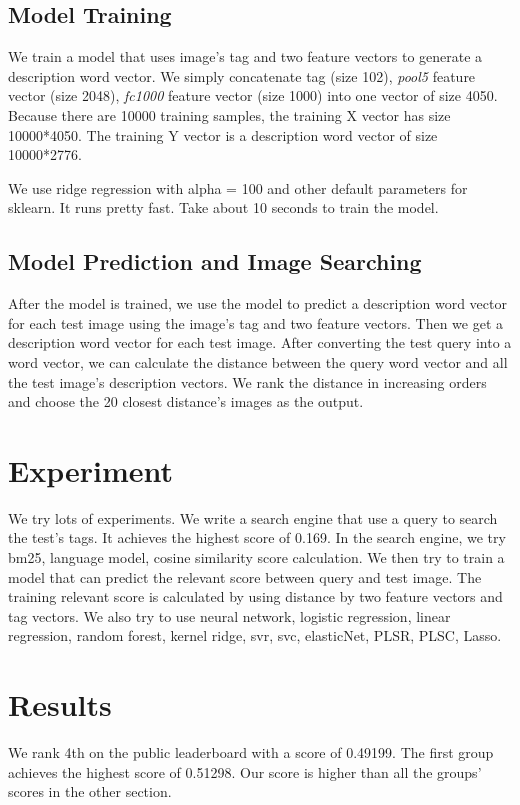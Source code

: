 \documentclass{article} %
\begin{document}
\subsection{Model Training}
We train a model that uses image's tag and two feature vectors to generate a description word vector. We simply concatenate tag (size 102), \textit{pool5} feature vector (size 2048), \textit{fc1000} feature vector (size 1000) into one vector of size 4050. Because there are 10000 training samples, the training X vector has size 10000*4050. The training Y vector is a description word vector of size 10000*2776.

We use ridge regression with alpha = 100 and other default parameters for sklearn. It runs pretty fast. Take about 10 seconds to train the model.

\subsection{Model Prediction and Image Searching}
After the model is trained, we use the model to predict a description word vector for each test image using the image's tag and two feature vectors. Then we get a description word vector for each test image. After converting the test query into a word vector, we can calculate the distance between the query word vector and all the test image's description vectors. We rank the distance in increasing orders and choose the 20 closest distance's images as the output.

\section{Experiment}

We try lots of experiments. We write a search engine that use a query to search the test's tags. It achieves the highest score of 0.169. In the search engine, we try bm25, language model, cosine similarity score calculation. We then try to train a model that can predict the relevant score between query and test image. The training relevant score is calculated by using distance by two feature vectors and tag vectors. We also try to use neural network, logistic regression, linear regression, random forest, kernel ridge, svr, svc, elasticNet, PLSR, PLSC, Lasso.

\section{Results}
We rank 4th on the public leaderboard with a score of 0.49199. The first group achieves the highest score of 0.51298. Our score is higher than all the groups' scores in the other section.
\end{document}
